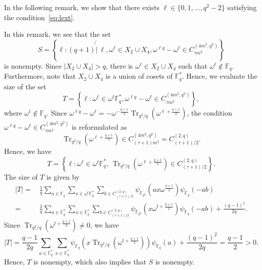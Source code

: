 \documentclass[ALCO,ThmDefs,Unicode]{cedram}
\DeclareMathOperator{\Tr}{Tr}
\newcommand*\F{{\mathbb F}}
\newcommand*{\notmid}{\mathbin{\not{|}\:}}
\begin{document}
In the following remark, we show that there exists $\ell \in \{0,1,\ldots,q^2-2\}$ satisfying the condition~\eqref{eq:lext}.

\begin{rema}\label{rem:cond25}
In this remark, we see that the set
\[
S=\left\{\ell :(q+1) \notmid \ell, \omega^{\ell}\in X_2\cup X_4,
\omega^{\ell q}-\omega^{\ell}\in C_{\tau m^2}^{(4m^2,q^2)} \right\}
\]
is nonempty. Since $|X_2\cup X_4|>q$, there is $\omega^\ell \in X_2\cup X_4$ such that $\omega^\ell \not \in \F_q$. Furthermore, note that $X_2\cup X_4$ is a union of cosets of $\F_{q}^\ast$. Hence, we evaluate the size of the set
\[
T=\left\{\ell: \omega^{\ell}\in \omega^t \F_q^\ast,
\omega^{\ell q}-\omega^{\ell}\in C_{\tau m^2}^{(4m^2,q^2)} \right\},
\]
where $\omega^t\not \in \F_q$. Since $\omega^{\ell q}-\omega^\ell=-\omega^{-\frac{q+1}{2}}\Tr_{q^2/q}(\omega^{\ell+\frac{q+1}{2}})$, the condition $\omega^{\ell q}-\omega^{\ell}\in C_{\tau m^2}^{(4m^2,q^2)}$ is reformulated as
\[
\Tr_{q^2/q}(\omega^{\ell+\frac{q+1}{2}})\in C_{(\tau +1)m^2}^{(4m^2,q^2)}= C_{(\tau +1)/2}^{(2,q)}.
\]
Hence, we have
\[
T=\left\{\ell:\omega^\ell \in \omega^t \F_q^\ast,\,\Tr_{q^2/q}(\omega^{\ell+\frac{q+1}{2}})\in C_{(\tau +1)/2}^{(2,q)}\right\}.
\]
The size of $T$ is given by
\begin{align*}
|T|=&\, \frac{1}{q}\sum_{a\in \F_q}\sum_{x\in \omega^t \F_q^\ast}\sum_{b\in C_{(\tau +1)/2}^{(2,q)}} \psi_{\F_{q^2}}(ax\omega^{\frac{q+1}{2}})\psi_{\F_q}(-ab)\\
=&\, \frac{1}{q}\sum_{a\in \F_q^\ast}\sum_{x\in \F_q^\ast}\sum_{b\in C_{(\tau +1)/2}^{(2,q)}} \psi_{\F_{q^2}}(x\omega^{t+\frac{q+1}{2}})\psi_{\F_q}(-ab)+\frac{(q-1)^2}{2q}.
\end{align*}
Since $\Tr_{q^2/q}(\omega^{t+\frac{q+1}{2}})\not=0$, we have
\[
|T|=\frac{q-1}{2q}\sum_{a\in \F_q^\ast}\sum_{x\in \F_q^\ast} \psi_{\F_{q}}(x\Tr_{q^2/q}(\omega^{t+\frac{q+1}{2}}))\psi_{\F_q}(a)+\frac{(q-1)^2}{2q} =\frac{q-1}{2}>0.
\]
Hence, $T$ is nonempty, which also implies that $S$ is nonempty.
\end{rema}
\end{document}
